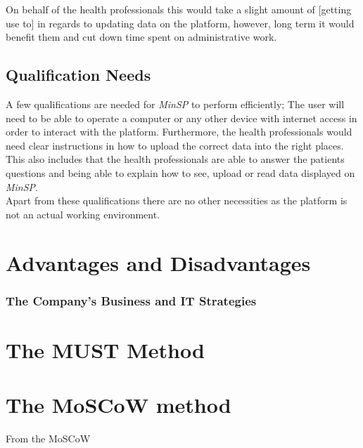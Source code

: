 \documentclass[a4paper,11pt]{article}
\begin{document}
On behalf of the health professionals this would take a slight amount of [getting use to] in regards to updating data on the platform, however, long term it would benefit them and cut down time spent on administrative work.\\


\subsection{Qualification Needs}
A few qualifications are needed for \textit{MinSP} to perform efficiently; The user will need to be able to operate a computer or any other device with internet access in order to interact with the platform. Furthermore, the health professionals would need clear instructions in how to upload the correct data into the right places. This also includes that the health professionals are able to answer the patients questions and being able to explain how to see, upload or read data displayed on \textit{MinSP}.\\

Apart from these qualifications there are no other necessities as the platform is not an actual working environment.\\

\section{Advantages and Disadvantages}
\subsubsection{The Company's Business and IT Strategies}

\section{The MUST Method}




\section{The MoSCoW method}
% 
From the MoSCoW 
\end{document}
